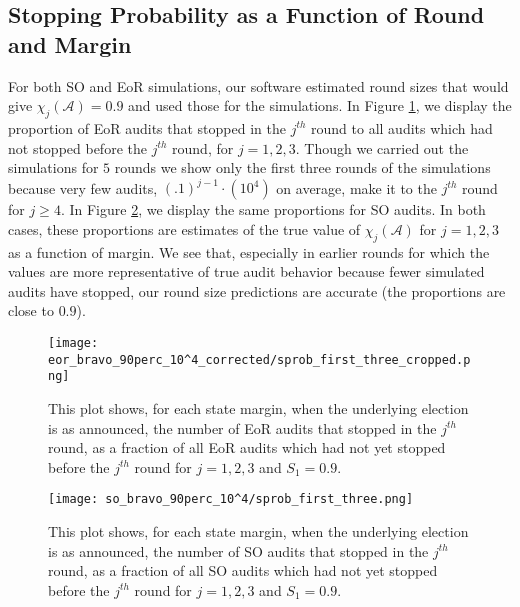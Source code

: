 \subsection{Stopping Probability as a Function of Round and Margin}
For both SO and EoR \BRAVO simulations, our software estimated round sizes that would give $\chi_j(\mathcal{A}) = 0.9$ and used those for the simulations. In Figure \ref{fig:eor_bravo_sprob}, we display the proportion of EoR \BRAVO audits that stopped in the $j^{th}$ round
to all audits which had not stopped before the $j^{th}$ round, for $j=1,2,3$. Though we carried out the simulations for $5$ rounds we show only the first three rounds of the simulations because very few audits, $(.1)^{j-1}\cdot(10^4)$ on average, 
make it to the $j^{th}$ round for $j \geq 4$. In Figure \ref{fig:so_bravo_sprob}, we display the same proportions for SO \BRAVO audits. 
In both cases, these proportions are estimates of the true value of $\chi_j(\mathcal{A})$ for $j=1,2,3$ as a function of margin. 
We see that, especially in earlier rounds for which 
the values are more representative of true audit behavior because fewer simulated audits have stopped, 
our round size predictions are accurate (the proportions are close to $0.9$).

\begin{figure}
\begin{centering}
\texttt{[image: eor\_bravo\_90perc\_10^4\_corrected/sprob\_first\_three\_cropped.png]}\caption{
This plot shows, for each state margin, when the underlying election is as announced, the number of EoR \BRAVO audits that stopped in the $j^{th}$ round,
as a fraction of all EoR \BRAVO audits which had not yet stopped before the $j^{th}$ round for $j=1,2,3$ and $S_1=0.9$.}
\label{fig:eor_bravo_sprob}
\end{centering}
\end{figure}

\begin{figure}
\begin{centering}
\texttt{[image: so\_bravo\_90perc\_10^4/sprob\_first\_three.png]}\caption{
This plot shows, for each state margin, when the underlying election is as announced, the number of SO \BRAVO audits that stopped in the $j^{th}$ round,
as a fraction of all SO \BRAVO audits which had not yet stopped before the $j^{th}$ round for $j=1,2,3$ and $S_1=0.9$.}
\label{fig:so_bravo_sprob}
\end{centering}
\end{figure}

